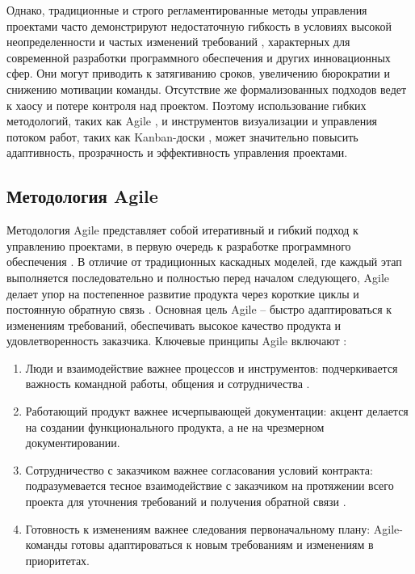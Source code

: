 Однако, традиционные и строго регламентированные методы управления проектами часто демонстрируют недостаточную гибкость в условиях высокой неопределенности и частых изменений требований \cite{management6}, характерных для современной разработки программного обеспечения и других инновационных сфер. Они могут приводить к затягиванию сроков, увеличению бюрократии и снижению мотивации команды. Отсутствие же формализованных подходов ведет к хаосу и потере контроля над проектом. Поэтому использование гибких методологий, таких как Agile \cite{agile4}, и инструментов визуализации и управления потоком работ, таких как Kanban-доски \cite{kanban1}, может значительно повысить адаптивность, прозрачность и эффективность управления проектами.

\subsection{Методология Agile}
Методология Agile представляет собой итеративный и гибкий подход к управлению проектами, в первую очередь к разработке программного обеспечения \cite{agile1}. В отличие от традиционных каскадных моделей, где каждый этап выполняется последовательно и полностью перед началом следующего, Agile делает упор на постепенное развитие продукта через короткие циклы и постоянную обратную связь \cite{agile5}. Основная цель Agile – быстро адаптироваться к изменениям требований, обеспечивать высокое качество продукта и удовлетворенность заказчика.
Ключевые принципы Agile включают \cite{website_agilemanifesto1}:

\begin{enumerate}
	\item Люди и взаимодействие важнее процессов и инструментов: подчеркивается важность командной работы, общения и сотрудничества \cite{agile5}.
	\item Работающий продукт важнее исчерпывающей документации: акцент делается на создании функционального продукта, а не на чрезмерном документировании.
	\item Сотрудничество с заказчиком важнее согласования условий контракта: подразумевается тесное взаимодействие с заказчиком на протяжении всего проекта для уточнения требований и получения обратной связи \cite{agile2}.
	\item Готовность к изменениям важнее следования первоначальному плану: Agile-команды готовы адаптироваться к новым требованиям и изменениям в приоритетах.
\end{enumerate}

